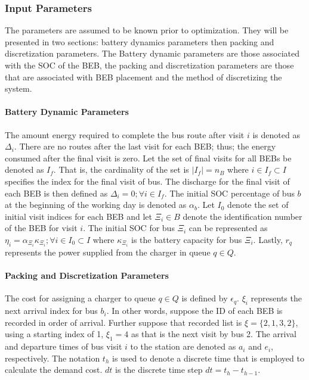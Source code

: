 \documentclass[energies,article,submit,moreauthors]{Definitions/mdpi}
\newcommand{\Iset}{I}                       %
\newcommand{\Isetinit}{I_0}                 %
\newcommand{\Isetfinal}{I_f}                %
\begin{document}
\subsubsection{Input Parameters}
\label{sec:input-variables}
The parameters are assumed to be known prior to optimization. They will be presented in two sections: battery dynamics
parameters then packing and discretization parameters. The Battery dynamic parameters are those associated with the SOC
of the BEB, the packing and discretization parameters are those that are associated with BEB placement and the method of
discretizing the system.

\paragraph{Battery Dynamic Parameters}
\label{sec:battery-dynamic-parameters}
The amount energy required to complete the bus route after visit \(i\) is denoted as \(\Delta_i\). There are no routes after the
last visit for each BEB; thus; the energy consumed after the final visit is zero. Let the set of final visits for all
BEBs be denoted as \(\Isetfinal\). That is, the cardinality of the set is \(\lvert \Isetfinal \rvert = n_B\) where \(i \in
\Isetfinal \subset \Iset\) specifies the index for the final visit of bus. The discharge for the final visit of each BEB is
then defined as \(\Delta_{i} = 0; \forall i \in \Isetfinal\). The initial SOC percentage of bus \(b\) at the beginning of the working day
is denoted as \(\alpha_b\). Let \(\Isetinit\) denote the set of initial visit indices for each BEB and let \(\Xi_i \in B\) denote the
identification number of the BEB for visit \(i\). The initial SOC for bus \(\Xi_i\) can be represented as \(\eta_{i} =
\alpha_{\Xi_i}\kappa_{\Xi_i}; \forall i \in \Isetinit \subset \Iset\) where \(\kappa_{\Xi_i}\) is the battery capacity for bus \(\Xi_i\). Lastly, \(r_q\) represents
the power supplied from the charger in queue \(q \in Q\).

\paragraph{Packing and Discretization Parameters}
\label{sec:packing-and-discretization-paramaters}
The cost for assigning a charger to queue \(q \in Q\) is defined by \(\epsilon_q\). \(\xi_i\) represents the next arrival index for bus
\(b_i\). In other words, suppose the ID of each BEB is recorded in order of arrival. Further suppose that recorded list is
\(\xi = \{ 2,1,3,2 \}\), using a starting index of 1, \(\xi_1 = 4\) as that is the next visit by bus 2. The arrival and
departure times of bus visit \(i\) to the station are denoted as \(a_i\) and \(e_i\), respectively. The notation \(t_h\) is used
to denote a discrete time that is employed to calculate the demand cost. \(dt\) is the discrete time step \(dt = t_h -
t_{h-1}\).
\end{document}
